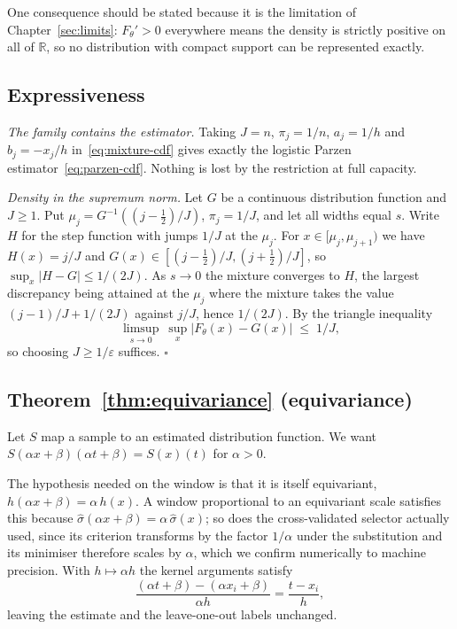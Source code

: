 \documentclass[11pt]{article}
\newcommand{\shat}{\hat{\sigma}}
\begin{document}
One consequence should be stated because it is the limitation of Chapter~\ref{sec:limits}:
$F_\theta' > 0$ everywhere means the density is strictly positive on all of $\mathbb{R}$, so
no distribution with compact support can be represented exactly.

\subsection*{Expressiveness}

\emph{The family contains the estimator.} Taking $J = n$, $\pi_j = 1/n$, $a_j = 1/h$ and
$b_j = -x_j/h$ in~\eqref{eq:mixture-cdf} gives exactly the logistic Parzen
estimator~\eqref{eq:parzen-cdf}. Nothing is lost by the restriction at full capacity.

\emph{Density in the supremum norm.} Let $G$ be a continuous distribution function and $J \ge
1$. Put $\mu_j = G^{-1}((j - \tfrac12)/J)$, $\pi_j = 1/J$, and let all widths equal $s$. Write
$H$ for the step function with jumps $1/J$ at the $\mu_j$. For $x \in [\mu_j, \mu_{j+1})$ we
have $H(x) = j/J$ and $G(x) \in [(j - \tfrac12)/J, (j + \tfrac12)/J]$, so $\sup_x |H - G| \le
1/(2J)$. As $s \to 0$ the mixture converges to $H$, the largest discrepancy being attained at
the $\mu_j$ where the mixture takes the value $(j-1)/J + 1/(2J)$ against $j/J$, hence
$1/(2J)$. By the triangle inequality
\[
\limsup_{s \to 0}\ \sup_x |F_\theta(x) - G(x)| \;\le\; 1/J ,
\]
so choosing $J \ge 1/\varepsilon$ suffices. \hfill$\square$

\subsection*{Theorem~\ref{thm:equivariance} (equivariance)}

Let $S$ map a sample to an estimated distribution function. We want $S(\alpha x +
\beta)(\alpha t + \beta) = S(x)(t)$ for $\alpha > 0$.

The hypothesis needed on the window is that it is itself equivariant, $h(\alpha x + \beta)
= \alpha\, h(x)$. A window proportional to an equivariant scale satisfies this because
$\shat(\alpha x + \beta) = \alpha\, \shat(x)$; so does the cross-validated selector actually
used, since its criterion transforms by the factor $1/\alpha$ under the substitution and its
minimiser therefore scales by $\alpha$, which we confirm numerically to machine precision.
With $h \mapsto \alpha h$ the kernel arguments satisfy
\[
\frac{(\alpha t + \beta) - (\alpha x_i + \beta)}{\alpha h} = \frac{t - x_i}{h},
\]
leaving the estimate and the leave-one-out labels unchanged.
\end{document}
